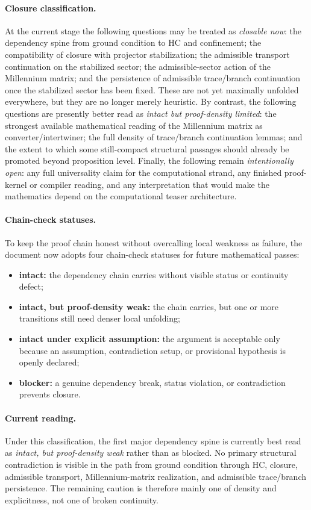 \paragraph{Closure classification.}
At the current stage the following questions may be treated as \emph{closable now}: the dependency spine from ground condition to HC and confinement; the compatibility of closure with projector stabilization; the admissible transport continuation on the stabilized sector; the admissible-sector action of the Millennium matrix; and the persistence of admissible trace/branch continuation once the stabilized sector has been fixed. These are not yet maximally unfolded everywhere, but they are no longer merely heuristic. By contrast, the following questions are presently better read as \emph{intact but proof-density limited}: the strongest available mathematical reading of the Millennium matrix as converter/intertwiner; the full density of trace/branch continuation lemmas; and the extent to which some still-compact structural passages should already be promoted beyond proposition level. Finally, the following remain \emph{intentionally open}: any full universality claim for the computational strand, any finished proof-kernel or compiler reading, and any interpretation that would make the mathematics depend on the computational teaser architecture.

\paragraph{Chain-check statuses.}
To keep the proof chain honest without overcalling local weakness as failure, the document now adopts four chain-check statuses for future mathematical passes:
\begin{itemize}[leftmargin=2em]
  \item \textbf{intact:} the dependency chain carries without visible status or continuity defect;
  \item \textbf{intact, but proof-density weak:} the chain carries, but one or more transitions still need denser local unfolding;
  \item \textbf{intact under explicit assumption:} the argument is acceptable only because an assumption, contradiction setup, or provisional hypothesis is openly declared;
  \item \textbf{blocker:} a genuine dependency break, status violation, or contradiction prevents closure.
\end{itemize}

\paragraph{Current reading.}
Under this classification, the first major dependency spine is currently best read as \emph{intact, but proof-density weak} rather than as blocked. No primary structural contradiction is visible in the path from ground condition through HC, closure, admissible transport, Millennium-matrix realization, and admissible trace/branch persistence. The remaining caution is therefore mainly one of density and explicitness, not one of broken continuity.

